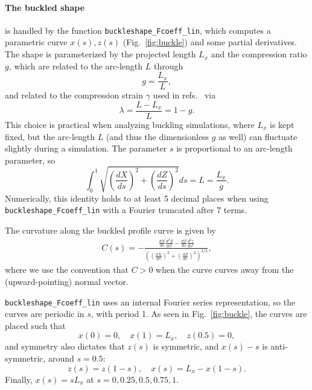 \documentclass[11pt,a4paper,twocolumn]{article}
\begin{document}
\paragraph{The buckled shape}
is handled by the function \texttt{buckleshape\_Fcoeff\_lin}, which
computes a parametric curve $x(s),z(s)$ (Fig.~\ref{fig:buckle}) and
some partial derivatives. The shape is parameterized by the projected
length $L_x$ and the compression ratio $g$, which are related to the
arc-length $L$ through
\begin{equation}
  g=\frac{L_x}{L},
\end{equation}
and related to the compression strain $\gamma$ used in
refs.~\cite{gomez2016,hu2013} via
\begin{equation}
  \lambda=\frac{L-L_x}{L}=1-g.
\end{equation}
This choice is practical when analyzing buckling simulations, where
$L_x$ is kept fixed, but the arc-length $L$ (and thus the dimensionless
$g$ as well) can fluctuate slightly during a simulation. The parameter
$s$ is proportional to an arc-length parameter, so 
\begin{equation}
%
  \int_0^1\sqrt{\left(\frac{dX}{ds}\right)^2+\left(\frac{dZ}{ds}\right)^2}ds
  =L=\frac{L_x}{g}.
\end{equation}
Numerically, this identity holds to at least 5 decimal places when
using \texttt{buckleshape\_Fcoeff\_lin} with a Fourier truncated after
7 terms.

The curvature along the buckled profile curve is given by
\begin{multline}
  C(s)=-\frac{\frac{dX}{ds}\frac{d^2Z}{ds^2}-\frac{dZ}{ds}\frac{d^2z}{ds^2}}{
    \left(
    \left(\frac{dX}{ds}\right)^2+\left(\frac{dZ}{ds}\right)^2
    \right)^{3/2}},
\end{multline}
where we use the convention that $C>0$ when the curve curves away from
the (upward-pointing) normal vector.

\texttt{buckleshape\_Fcoeff\_lin} uses an internal Fourier series
representation, so the curves are periodic in $s$, with period 1. As
seen in Fig.~\ref{fig:buckle}, the curves are placed such that
\begin{equation}
x(0)=0,\quad
x(1)=L_x,\quad 
z(0.5)=0,
\end{equation}
and symmetry also dictates that $z(s)$ is symmetric, 
and $x(s)-s$ is anti-symmetric,  around $s=0.5$:
\begin{equation}
  z(s)=z(1-s),\quad
  x(s)=L_x-x(1-s).
\end{equation}
Finally, $x(s)=sL_x$ at $s=0,0.25,0.5,0.75,1$.
\end{document}
